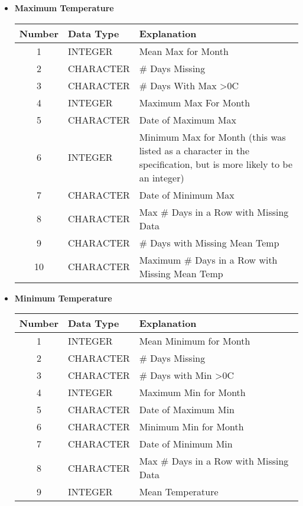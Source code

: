 \documentclass[12pt]{article}
\begin{document}
\begin{itemize}
\begin{itemize}
\item \textbf{Maximum Temperature} \\
\begin{tabular}{c | l | p{6cm}}
Number & Data Type & Explanation \\
\hline
1 & INTEGER & Mean Max for Month \\
2 & CHARACTER & \# Days Missing \\
3 & CHARACTER & \# Days With Max \textgreater 0C \\
4 & INTEGER & Maximum Max For Month \\
5 & CHARACTER & Date of Maximum Max \\
6 & INTEGER & Minimum Max for Month (this was listed as a character in the specification, but is more likely to be an integer) \\
7 & CHARACTER & Date of Minimum Max \\
8 & CHARACTER & Max \# Days in a Row with Missing Data \\
9 & CHARACTER & \# Days with Missing Mean Temp \\
10 & CHARACTER & Maximum \# Days in a Row with Missing Mean Temp
\end{tabular}

\item \textbf{Minimum Temperature} \\
\begin{tabular}{c | l | p{6cm}}
Number & Data Type & Explanation \\
\hline
1 & INTEGER & Mean Minimum for Month \\
2 & CHARACTER & \# Days Missing \\
3 & CHARACTER & \# Days with Min \textgreater 0C \\
4 & INTEGER & Maximum Min for Month \\
5 & CHARACTER & Date of Maximum Min \\
6 & CHARACTER & Minimum Min for Month \\
7 & CHARACTER & Date of Minimum Min \\
8 & CHARACTER & Max \# Days in a Row with Missing Data \\
9 & INTEGER & Mean Temperature
\end{tabular}


\end{itemize}
\end{itemize}
\end{document}
